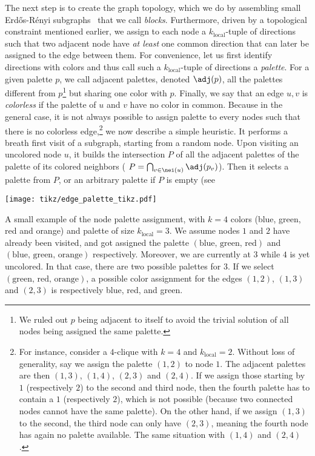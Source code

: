 The next step is to create the graph topology, which we do by assembling small Erdős-Rényi
subgraphs~\autocites{erdos1959random}{gilbertRG59} that we call \emph{blocks}. Furthermore, driven
by a topological constraint mentioned earlier, we assign to each node a $k_\mathrm{local}$-tuple of
directions such that two adjacent node have \emph{at least} one common direction that can later be
assigned to the edge between them. For convenience, let us first identify directions with colors and
thus call such a $k_\mathrm{local}$-tuple of directions a \emph{palette}. For a given palette $p$,
we call adjacent palettes, denoted $\adj(p)$, all the palettes different from $p$\footnote{We ruled
out $p$ being adjacent to itself to avoid the trivial solution of all nodes being assigned the same
palette.} but sharing one
color with $p$. Finally, we say that an edge $u,v$ is \emph{colorless} if the palette of $u$ and $v$ have
no color in common. Because in the general case, it is not always possible to assign palette to
every nodes such that there is no colorless edge,\footnote{For instance, consider a $4$-clique with $k=4$
and $k_\mathrm{local}=2$. Without loss of generality, say we assign the palette $(1,2)$ to node
$1$. The adjacent palettes are then $(1,3)$, $(1,4)$, $(2,3)$ and $(2,4)$. If we assign those
starting by $1$ (respectively $2$) to the second and third node, then the fourth palette has to
contain a $1$ (respectively $2$), which is not possible (because two connected nodes cannot have the
same palette). On the other hand, if we assign $(1,3)$ to the second, the third node can only have
$(2,3)$, meaning the fourth node has again no palette available. The same situation with $(1,4)$ and
$(2,4)$.} we now describe a simple heuristic. It performs a breath first visit of a subgraph,
starting from a random node. Upon visiting an uncolored node $u$, it builds the intersection $P$ of
all the adjacent palettes of the palette of its colored neighbors (\ie{} $P=\bigcap_{v\in \nei(u)}
\adj(p_v)$). Then it selects \uar{} a palette from $P$, or an arbitrary palette if $P$ is empty (see
\begin{marginfigure}
  \centering
	\texttt{[image: tikz/edge\_palette\_tikz.pdf]}
	\caption{A small example of the node palette assignment, with $k=4$ colors (blue, green, red and
		orange) and palette of size $k_\mathrm{local}=3$. We assume nodes $1$ and $2$ have already been
		visited, and got assigned the palette $(\text{blue, green, red})$ and $(\text{blue, green,
		orange})$ respectively. Moreover, we are currently at $3$ while $4$ is yet uncolored. In that
		case, there are two possible palettes for $3$. If we select $(\text{green, red, orange})$, a
		possible color assignment for the edges $(1,2)$, $(1, 3)$ and $(2, 3)$ is respectively blue,
		red, and green.
	\label{fig:edge_palette}}
\end{marginfigure}
